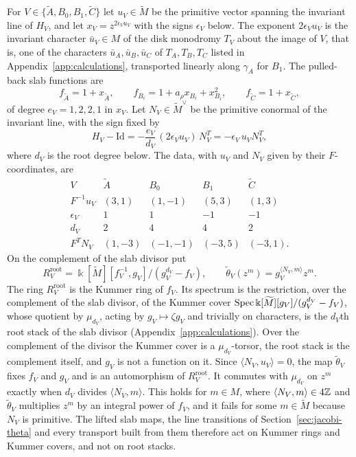 For $V\in\{\widetilde A,B_0,B_1,\widetilde C\}$ let $u_V\in\widetilde M$ be
the primitive vector spanning the invariant line of $H_V$, and let
$x_V=z^{2\epsilon_Vu_V}$ with the signs $\epsilon_V$ below.  The exponent
$2\epsilon_Vu_V$ is the invariant character $\bar u_V\in M$ of the disk
monodromy $T_V$ about the image of $V$, that is, one of the characters
$\bar u_A,\bar u_B,\bar u_C$ of $T_A,T_B,T_C$ listed in
Appendix~\ref{app:calculations}, transported linearly along $\gamma_A$ for
$B_1$.  The pulled-back slab functions are
\[
 f_{\widetilde A}=1+x_{\widetilde A},\qquad
 f_{B_i}=1+a_\rho x_{B_i}+x_{B_i}^2,\qquad
 f_{\widetilde C}=1+x_{\widetilde C},
\]
of degree $e_V=1,2,2,1$ in $x_V$.  Let $N_V\in\widetilde M^\vee$ be the
primitive conormal of the invariant line, with the sign fixed by
\begin{equation}\label{eq:monodromy-sign}
 H_V-\mathrm{Id}=-\frac{e_V}{d_V}\,(2\epsilon_Vu_V)\,N_V^{T}=-\epsilon_V\,u_VN_V^T,
\end{equation}
where $d_V$ is the root degree below.  The data, with $u_V$ and $N_V$ given
by their $F$-coordinates, are
\begin{equation}\label{eq:root-data}
\begin{array}{c|cccc}
 V&\widetilde A&B_0&B_1&\widetilde C\\ \hline
 F^{-1}u_V&(3,1)&(1,-1)&(5,3)&(1,3)\\
 \epsilon_V&1&1&-1&-1\\
 d_V&2&4&4&2\\
 F^{T}N_V&(1,-3)&(-1,-1)&(-3,5)&(-3,1).
\end{array}
\end{equation}
On the complement of the slab divisor put
\begin{equation}\label{eq:local-root-ring}
 R_V^{\mathrm{root}}
 =\Bbbk[\widetilde M][f_V^{-1},g_V]/(g_V^{d_V}-f_V),
 \qquad
 \widetilde\theta_V(z^m)=g_V^{\langle N_V,m\rangle}z^m.
\end{equation}
The ring $R_V^{\mathrm{root}}$ is the Kummer ring of $f_V$.  Its spectrum is
the restriction, over the complement of the slab divisor, of the Kummer
cover $\operatorname{Spec}\Bbbk[\widetilde M][g_V]/(g_V^{d_V}-f_V)$, whose quotient by
$\mu_{d_V}$, acting by $g_V\mapsto\zeta g_V$ and trivially on characters, is
the $d_V$th root stack of the slab divisor (Appendix~\ref{app:calculations}).
Over the complement of the divisor the Kummer cover is a
$\mu_{d_V}$-torsor, the root stack is the complement itself, and $g_V$ is not
a function on it.  Since $\langle N_V,u_V\rangle=0$, the map
$\widetilde\theta_V$ fixes $f_V$ and $g_V$ and is an automorphism of
$R_V^{\mathrm{root}}$.  It commutes with $\mu_{d_V}$ on $z^m$ exactly when
$d_V$ divides $\langle N_V,m\rangle$.  This holds for $m\in M$, where
$\langle N_V,m\rangle\in4\mathbb Z$ and $\widetilde\theta_V$ multiplies $z^m$ by an
integral power of $f_V$, and it fails for some $m\in\widetilde M$ because
$N_V$ is primitive.  The lifted slab maps, the line transitions of
Section~\ref{sec:jacobi-theta} and every transport built from them therefore
act on Kummer rings and Kummer covers, and not on root stacks.

